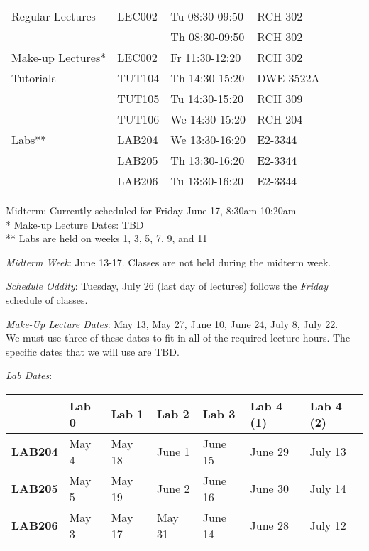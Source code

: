 \documentclass[letterpaper,10pt]{article}
\begin{document}
\begin{table}[h]
        \begin{center}
        \begin{tabular}{l l l l}
				Regular Lectures & LEC002 & Tu 08:30-09:50 & RCH 302 	\\
								 & 		  & Th 08:30-09:50 & RCH 302 	\\
				\hline
				Make-up Lectures*& LEC002 & Fr 11:30-12:20 & RCH 302 	\\
				\hline			
				Tutorials 		 & TUT104 & Th 14:30-15:20 & DWE 3522A 	\\
						  		 & TUT105 & Tu 14:30-15:20 & RCH 309   	\\
						  		 & TUT106 & We 14:30-15:20 & RCH 204   	\\
				\hline			
				Labs** 	  		 & LAB204 & We 13:30-16:20 & E2-3344	\\
								 & LAB205 & Th 13:30-16:20 & E2-3344	\\
								 & LAB206 & Tu 13:30-16:20 & E2-3344	\\
				\hline
			\end{tabular}
        \end{center}
        Midterm: Currently scheduled for Friday June 17, 8:30am-10:20am				\\
		*    Make-up Lecture Dates: TBD						\\
		**   Labs are held on weeks 1, 3, 5, 7, 9, and 11
\end{table}

\textit{Midterm Week}: June 13-17. Classes are not held during the midterm week.

\textit{Schedule Oddity}: Tuesday, July 26 (last day of lectures) follows the \textit{Friday} schedule of classes.

\textit{Make-Up Lecture Dates}: May 13, May 27, June 10, June 24, July 8, July 22. \\
We must use three of these dates to fit in all of the required lecture hours. The specific dates that we will use are TBD.

\textit{Lab Dates}:

\begin{center}	
	\begin{tabular}{l|l l l l l l}
		 & \textbf{Lab 0} & \textbf{Lab 1} & \textbf{Lab 2} & \textbf{Lab 3} & \textbf{Lab 4 (1)} & \textbf{Lab 4 (2)} 		\\
		 \hline
		\textbf{LAB204} & May 4 & May 18 & June 1 & June 15 & June 29 & July 13 	\\
		\hline
		\textbf{LAB205} & May 5 & May 19 & June 2 & June 16 & June 30 & July 14	\\
		\hline
		\textbf{LAB206} & May 3 & May 17 & May 31 & June 14 & June 28 & July 12  \\
	\end{tabular}	
	\end{center}
\end{document}
